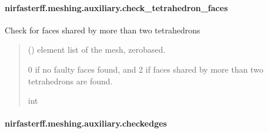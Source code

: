 \documentclass[letterpaper,10pt,english]{sphinxmanual}
\begin{document}
\sphinxstepscope


\paragraph{nirfasterff.meshing.auxiliary.check\_tetrahedron\_faces}
\label{\detokenize{_autosummary/nirfasterff.meshing.auxiliary.check_tetrahedron_faces:nirfasterff-meshing-auxiliary-check-tetrahedron-faces}}\label{\detokenize{_autosummary/nirfasterff.meshing.auxiliary.check_tetrahedron_faces::doc}}

\begin{fulllineitems}
\label{\detokenize{_autosummary/nirfasterff.meshing.auxiliary.check_tetrahedron_faces:nirfasterff.meshing.auxiliary.check_tetrahedron_faces}}
\pysigstartsignatures
\pysiglinewithargsret
{}
{}
{}
\pysigstopsignatures
\sphinxAtStartPar
Check for faces shared by more than two tetrahedrons
\begin{quote}\begin{description}
\sphinxAtStartPar
{} () \textendash{} element list of the mesh, zero\sphinxhyphen{}based.

\sphinxAtStartPar
{} \textendash{} 0 if no faulty faces found, and 2 if faces shared by more than two tetrahedrons are found.

\sphinxAtStartPar
int

\end{description}\end{quote}

\end{fulllineitems}


\sphinxstepscope


\paragraph{nirfasterff.meshing.auxiliary.checkedges}
\label{\detokenize{_autosummary/nirfasterff.meshing.auxiliary.checkedges:nirfasterff-meshing-auxiliary-checkedges}}\label{\detokenize{_autosummary/nirfasterff.meshing.auxiliary.checkedges::doc}}
\end{document}

